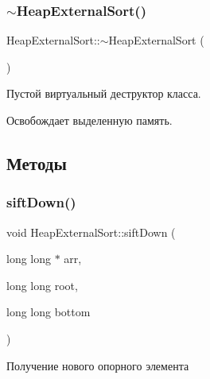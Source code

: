 \subsubsection{\texorpdfstring{$\sim$\+Heap\+External\+Sort()}{~HeapExternalSort()}}
{\footnotesize\ttfamily Heap\+External\+Sort\+::$\sim$\+Heap\+External\+Sort (\begin{DoxyParamCaption}{ }\end{DoxyParamCaption})}



Пустой виртуальный деструктор класса. 

Освобождает выделенную память. 

\subsection{Методы}
\hypertarget{class_heap_external_sort_af476431c6fafd53c40ab306c97a37134}{}\label{class_heap_external_sort_af476431c6fafd53c40ab306c97a37134} 
\subsubsection{\texorpdfstring{sift\+Down()}{siftDown()}}
{\footnotesize\ttfamily void Heap\+External\+Sort\+::sift\+Down (\begin{DoxyParamCaption}\item[{long long $\ast$}]{arr,  }\item[{long long}]{root,  }\item[{long long}]{bottom }\end{DoxyParamCaption})\hspace{0.3cm}{\ttfamily [private]}}



Получение нового опорного элемента 


